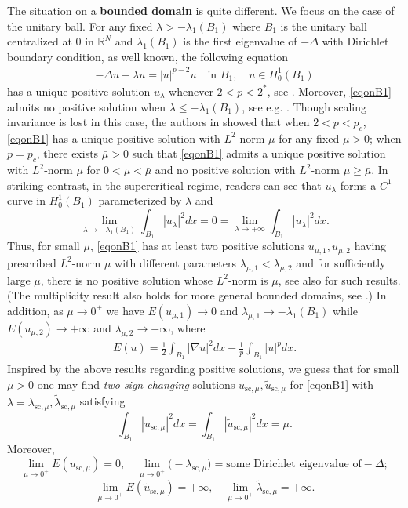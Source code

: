 \documentclass[10pt,a4paper]{article}
\theoremstyle{definition} \theoremstyle{remark}
\numberwithin{equation}{section}
\newcommand{\R}{\mathbb{R}}
\newcommand{\la}{\lambda}
\begin{document}
The situation on a {\bf bounded domain}  is quite different. We focus on the case of the unitary ball. For any fixed $\la > -\la_1(B_1)$ where $B_1$ is the unitary ball centralized at $0$ in $\R^N$ and $\la_1(B_1)$ is the first eigenvalue of $-\Delta$ with Dirichlet boundary condition, as well known, the following equation
\begin{align} \label{eqonB1}
	-\Delta u + \la u = |u|^{p-2}u \quad \text{in } B_1, \quad u \in H_0^1(B_1)
\end{align}
has a unique positive solution $u_\la$ whenever $2 < p < 2^*$, see \cite{GNN,Korman,Kwong,KL,Zhang}. Moreover, \eqref{eqonB1} admits no positive solution when $\la \leq -\la_1(B_1)$, see e.g. \cite[Theorem 1.19]{Willem}. Though scaling invariance is lost in this case, the authors in \cite{NTV} showed that when $2 < p < p_c$, \eqref{eqonB1} has a unique positive solution with $L^2$-norm $\mu$ for any fixed $\mu > 0$; when $p = p_c$, there exists $\bar \mu > 0$ such that \eqref{eqonB1} admits a unique positive solution with $L^2$-norm $\mu$ for $0 < \mu < \bar \mu$ and no positive solution with $L^2$-norm $\mu \geq \bar \mu$. In striking contrast, in the supercritical regime, readers can see \cite{Song} that $u_\la$ forms a $C^1$ curve in $H_0^1(B_1)$ parameterized by $\la$ and
$$\lim_{\la \to -\la_1(B_1)}\int_{B_1}|u_\la|^2dx = 0 = \lim_{\la \to +\infty}\int_{B_1}|u_\la|^2dx.$$
Thus, for small $\mu$, \eqref{eqonB1} has at least two positive solutions $u_{\mu,1}, u_{\mu,2}$ having prescribed $L^2$-norm $\mu$ with different parameters $\la_{\mu,1} < \la_{\mu,2}$ and for sufficiently large $\mu$, there is no positive solution whose $L^2$-norm is $\mu$, see also \cite{NTV} for such results. (The multiplicity result also holds for more general bounded domains, see \cite{CLY,PVY,SZ2024}.) In addition, as $\mu \to 0^+$ we have $E(u_{\mu,1}) \to 0$ and $\la_{\mu,1} \to - \la_1(B_1)$ while $E(u_{\mu,2}) \to +\infty$ and $\la_{\mu,2} \to +\infty$, where
\begin{align*}
	E(u) = \frac12 \int_{B_1}|\nabla u|^2dx - \frac{1}p\int_{B_1} |u|^pdx.
\end{align*}	
Inspired by the  above results regarding positive solutions, we guess that for small $\mu > 0$ one may find \emph{two  sign-changing} solutions $u_{\text{sc},\mu}, \tilde u_{\text{sc},\mu}$ for \eqref{eqonB1} with $\la = \la_{\text{sc},\mu}, \tilde \la_{\text{sc},\mu}$ satisfying $$\int_{B_1}|u_{\text{sc},\mu}|^2dx = \int_{B_1}|\tilde u_{\text{sc},\mu}|^2dx = \mu.$$
Moreover,
$$ \lim_{\mu \to 0^+} E(u_{\text{sc},\mu})= 0,\quad \lim_{\mu \to 0^+} \Big(-\la_{\text{sc},\mu}\Big) =  \text{some Dirichlet eigenvalue of}  -\Delta;$$
$$ \lim_{\mu \to 0^+} E(\tilde u_{\text{sc},\mu}) = +\infty,\quad \lim_{\mu \to 0^+} \tilde \la_{\text{sc},\mu} = +\infty.$$   
\end{document}
